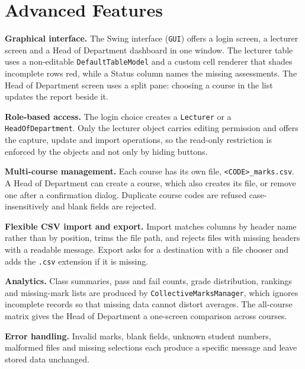 \section{Advanced Features}\label{sec:adv}

\textbf{Graphical interface.} The Swing interface (\texttt{GUI}) offers a login screen, a lecturer screen and a Head of Department dashboard in one window. The lecturer table uses a non-editable \texttt{DefaultTableModel} and a custom cell renderer that shades incomplete rows red, while a Status column names the missing assessments. The Head of Department screen uses a split pane: choosing a course in the list updates the report beside it.

\textbf{Role-based access.} The login choice creates a \texttt{Lecturer} or a \texttt{HeadOfDepartment}. Only the lecturer object carries editing permission and offers the capture, update and import operations, so the read-only restriction is enforced by the objects and not only by hiding buttons.

\textbf{Multi-course management.} Each course has its own file, \texttt{<CODE>\_marks.csv}. A Head of Department can create a course, which also creates its file, or remove one after a confirmation dialog. Duplicate course codes are refused case-insensitively and blank fields are rejected.

\textbf{Flexible CSV import and export.} Import matches columns by header name rather than by position, trims the file path, and rejects files with missing headers with a readable message. Export asks for a destination with a file chooser and adds the \texttt{.csv} extension if it is missing.

\textbf{Analytics.} Class summaries, pass and fail counts, grade distribution, rankings and missing-mark lists are produced by \texttt{CollectiveMarksManager}, which ignores incomplete records so that missing data cannot distort averages. The all-course matrix gives the Head of Department a one-screen comparison across courses.

\textbf{Error handling.} Invalid marks, blank fields, unknown student numbers, malformed files and missing selections each produce a specific message and leave stored data unchanged.
